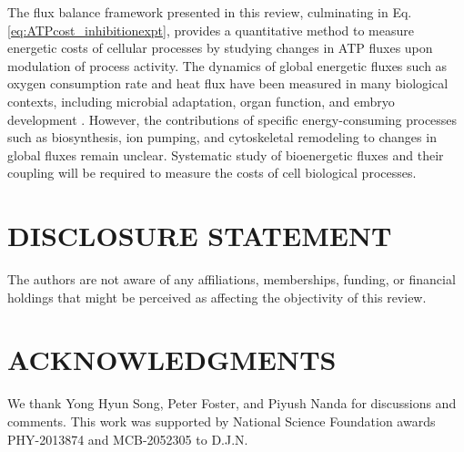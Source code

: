 \documentclass{compactarticle}
\begin{document}
The flux balance framework presented in this review, culminating in Eq. \ref{eq:ATPcost_inhibitionexpt}, provides a quantitative method to measure energetic costs of cellular processes by studying changes in ATP fluxes upon modulation of process activity. The dynamics of global energetic fluxes such as oxygen consumption rate and heat flux have been measured in many biological contexts, including microbial adaptation, organ function, and embryo development \cite{brettel_microcalorimetric_1981, kooragayala_quantification_2015, neville_novel_2018, koopman_screening-based_2016, astrup_oxygen_1981, engl_non-signalling_2017, robador_nanocalorimetry_2019, peitzsch_real_2008, tourmente_differences_2015,dietz_daily_1998, nagano_temperature-independent_2014, rodenfels_heat_2019,rodenfels_contribution_2020,song_energy_2019, ghosh2022developmental}. However, the contributions of specific energy-consuming processes such as biosynthesis, ion pumping, and cytoskeletal remodeling to changes in global fluxes remain unclear. Systematic study of bioenergetic fluxes and their coupling will be required to measure the costs of cell biological processes.

\section*{DISCLOSURE STATEMENT}
The authors are not aware of any affiliations, memberships, funding, or financial holdings that might be perceived as affecting the objectivity of this review. 

\section*{ACKNOWLEDGMENTS}
We thank Yong Hyun Song, Peter Foster, and Piyush Nanda for discussions and comments. This work was supported by National Science Foundation awards PHY-2013874 and MCB-2052305 to D.J.N.

\printbibliography
\end{document}
